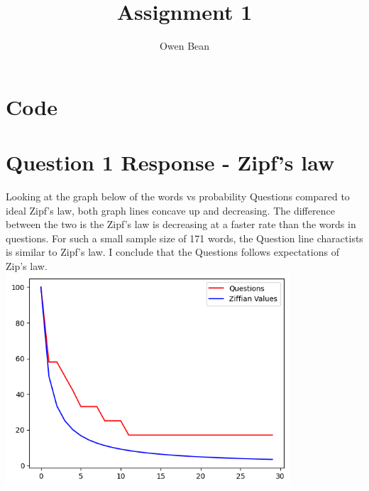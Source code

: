\documentclass{article}
\title{Assignment 1}
\author{Owen Bean}
\begin{document}
\maketitle

\section{Code}

\section{Question 1 Response - Zipf's law}

Looking at the graph below of the words vs probability Questions compared to ideal Zipf's law, both graph lines concave up and decreasing. The difference between the two is the Zipf's law is decreasing at a faster rate than the words in questions. For such a small sample size of 171 words, the Question line charactists is similar to Zipf's law. I conclude that the Questions follows expectations of Zip's law.
\\

\includegraphics[width=400]{images/zipf.png}
\end{document}
